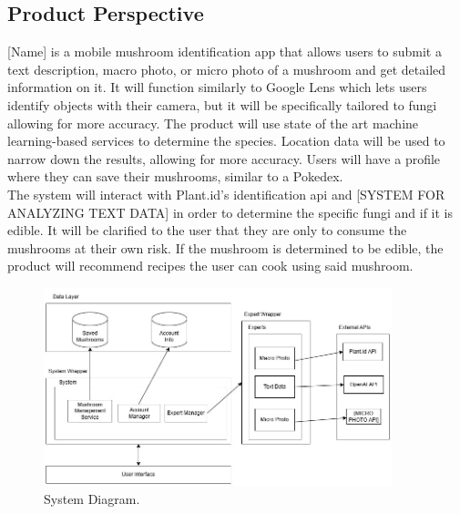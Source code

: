 \documentclass[]{article}
\begin{document}
\subsection{Product Perspective}
\label{sub:product_perspective}
[Name] is a mobile mushroom identification app that allows users to submit a text description, macro photo, or micro photo of a mushroom and get detailed information on it. It will function similarly to Google Lens which lets users identify objects with their camera, but it will be specifically tailored to fungi allowing for more accuracy. The product will use state of the art machine learning-based services to determine the species. Location data will be used to narrow down the results, allowing for more accuracy. Users will have a profile where they can save their mushrooms, similar to a Pokedex.\\

The system will interact with Plant.id's identification api and [SYSTEM FOR ANALYZING TEXT DATA] in order to determine the specific fungi and if it is edible. It will be clarified to the user that they are only to consume the mushrooms at their own risk. If the mushroom is determined to be edible, the product will recommend recipes the user can cook using said mushroom. \\

\begin{figure}[h!]
    \centering
    \includegraphics[width=0.9\textwidth]{BlockDiagram.jpg}
    \caption{System Diagram.}
    \label{fig:example}
\end{figure}
\end{document}
